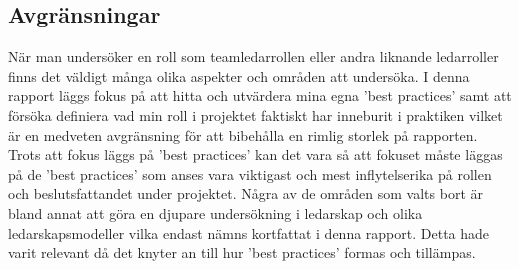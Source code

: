 \subsection{Avgränsningar}
När man undersöker en roll som teamledarrollen eller andra liknande ledarroller finns det väldigt många olika aspekter och områden att undersöka. I denna rapport läggs fokus på att hitta och utvärdera mina egna 'best practices' samt att försöka definiera vad min roll i projektet faktiskt har inneburit i praktiken vilket är en medveten avgränsning för att bibehålla en rimlig storlek på rapporten. Trots att fokus läggs på 'best practices' kan det vara så att fokuset måste läggas på de 'best practices' som anses vara viktigast och mest inflytelserika på rollen och beslutsfattandet under projektet.
\newline \newline
Några av de områden som valts bort är bland annat att göra en djupare undersökning i ledarskap och olika ledarskapsmodeller vilka endast nämns kortfattat i denna rapport. Detta hade varit relevant då det knyter an till hur 'best practices' formas och tillämpas. 
